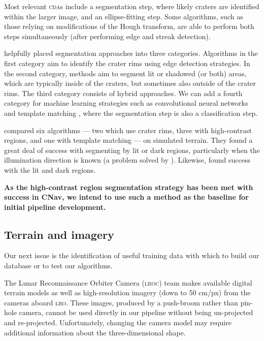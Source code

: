 \documentclass[12pt]{olfmemo}
\begin{document}
Most relevant \textsc{cda}s include a segmentation step, where likely craters are identified within the larger image, and an ellipse-fitting step. Some algorithms, such as those relying on modifications of the Hough transform, are able to perform both steps simultaneously (after performing edge and streak detection).

\citet{Maass2016} helpfully placed segmentation approaches into three categories. Algorithms in the first category aim to identify the crater rims using edge detection strategies. In the second category, methods aim to segment lit or shadowed (or both) areas, which are typically inside of the craters, but sometimes also outside of the crater rims. The third category consists of hybrid approaches. We can add a fourth category for machine learning strategies such as convolutional neural networks \citep{DeLatte2019} and template matching \citep{Bandeira2007}, where the segmentation step is also a classification step. %

\citet{Woicke2018} compared six algorithms --- two which use crater rims, three with high-contrast regions, and one with template matching --- on simulated terrain. They found a great deal of success with segmenting by lit or dark regions, particularly when the illumination direction is known (a problem solved by \citet{Maass2016}). Likewise, \citet{Maass2020} found success with the lit and dark regions.

\textbf{As the high-contrast region segmentation strategy has been met with success in CNav, we intend to use such a method as the baseline for initial pipeline development.}

\subsection{Terrain and imagery}
Our next issue is the identification of useful training data with which to build our database or to test our algorithms.

The Lunar Reconnaissance Orbiter Camera (\textsc{lroc}) team makes available digital terrain models as well as high-resolution imagery (down to 50 cm/px) from the cameras aboard \textsc{lro}. These images, produced by a push-broom rather than pin-hole camera, cannot be used directly in our pipeline without being un-projected and re-projected. Unfortunately, changing the camera model may require additional information about the three-dimensional shape.
\end{document}
